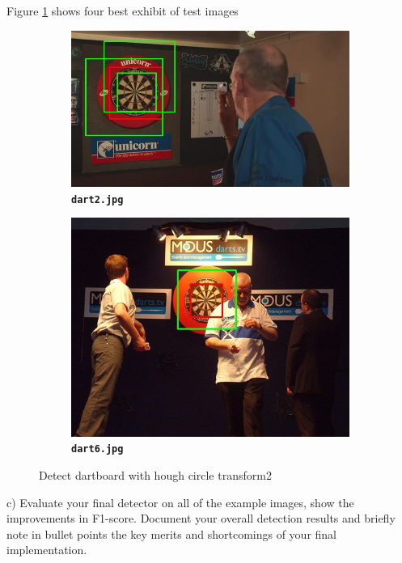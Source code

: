 \documentclass[12pt]{article}
\begin{document}
Figure \ref{fig:5} shows four best exhibit of test images 
\begin{figure}[htb]
	\centering
	\begin{subfigure}[b]{.48\linewidth}
		\centering
		\includegraphics[width=\linewidth]{task4/result/dart2_detected.jpg}
		\caption{\textbf{\texttt{dart2.jpg}}}
	\end{subfigure}
	\begin{subfigure}[b]{.48\linewidth}
		\centering
		\includegraphics[width=\linewidth]{task4/result/dart6_detected.jpg}
		\caption{\textbf{\texttt{dart6.jpg}}}
	\end{subfigure}
	\caption{Detect dartboard with hough circle transform2}
	\label{fig:5}
\end{figure}

c) Evaluate your final detector on all of the example images, show the improvements in F1-score. Document your overall detection results and briefly note in bullet points the key merits and shortcomings of your final implementation.\\
\end{document}
